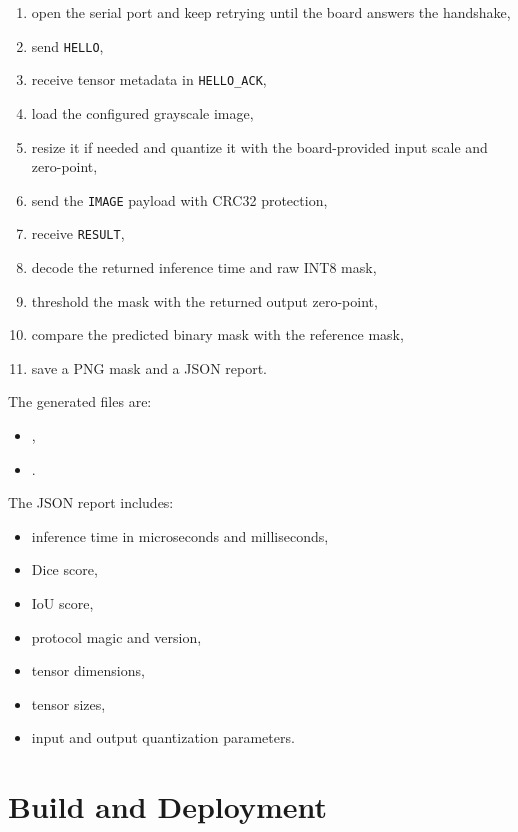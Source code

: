 \documentclass[11pt,a4paper]{article}
\begin{document}
\begin{enumerate}
\item open the serial port and keep retrying until the board answers the handshake,
\item send \texttt{HELLO},
\item receive tensor metadata in \texttt{HELLO\_ACK},
\item load the configured grayscale image,
\item resize it if needed and quantize it with the board-provided input scale and
      zero-point,
\item send the \texttt{IMAGE} payload with CRC32 protection,
\item receive \texttt{RESULT},
\item decode the returned inference time and raw INT8 mask,
\item threshold the mask with the returned output zero-point,
\item compare the predicted binary mask with the reference mask,
\item save a PNG mask and a JSON report.
\end{enumerate}

The generated files are:

\begin{itemize}
\item {},
\item {}.
\end{itemize}

The JSON report includes:

\begin{itemize}
\item inference time in microseconds and milliseconds,
\item Dice score,
\item IoU score,
\item protocol magic and version,
\item tensor dimensions,
\item tensor sizes,
\item input and output quantization parameters.
\end{itemize}

\section{Build and Deployment}
\end{document}

